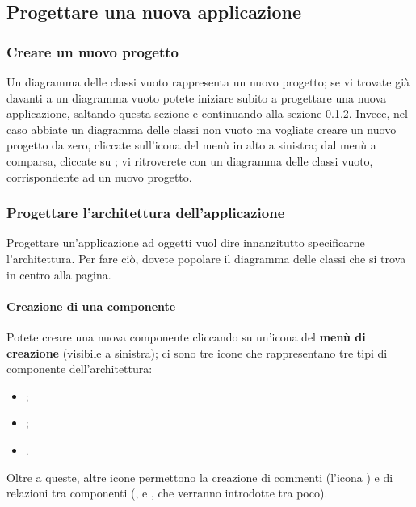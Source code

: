 \subsection{Progettare una nuova applicazione} \label{sec:new}

\subsubsection{Creare un nuovo progetto}
Un diagramma delle classi vuoto rappresenta un nuovo progetto; se vi trovate già davanti a un diagramma vuoto potete iniziare subito a progettare una nuova applicazione, saltando questa sezione e continuando alla sezione \ref{par:arch}. Invece, nel caso abbiate un diagramma delle classi non vuoto ma vogliate creare un nuovo progetto da zero, cliccate sull'icona del menù in alto a sinistra; dal menù a comparsa, cliccate su ; vi ritroverete con un diagramma delle classi vuoto, corrispondente ad un nuovo progetto.

\subsubsection{Progettare l'architettura dell'applicazione} \label{par:arch}
Progettare un'applicazione ad oggetti vuol dire innanzitutto specificarne l'architettura. Per fare ciò, dovete popolare il diagramma delle classi che si trova in centro alla pagina.

\paragraph{Creazione di una componente} Potete creare una nuova componente cliccando su un'icona del \textbf{menù di creazione} (visibile a sinistra); ci sono tre icone che rappresentano tre tipi di componente dell'architettura:
\begin{itemize}
	\item {};
	\item {};
	\item {}.
\end{itemize}
Oltre a queste, altre icone permettono la creazione di commenti (l'icona ) e di relazioni tra componenti (,  e , che verranno introdotte tra poco).

